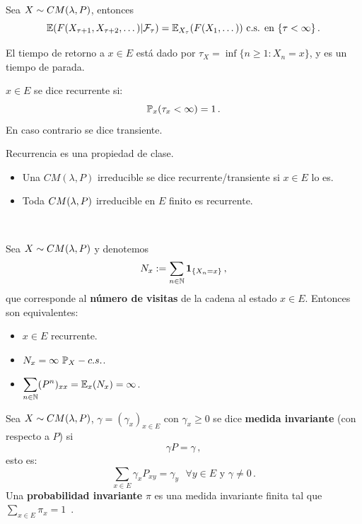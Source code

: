 \begin{theorem}
Sea $X\sim\cm$, entonces
$$ \E(F(X_{\tau+1},X_{\tau+2},\dots)|\mathcal{F}_\tau)=\E_{X_\tau}(F(X_1,\dots)) \mbox{ c.s. en }\{\tau<\infty\} \, .$$
\end{theorem}
\begin{remark}
El tiempo de retorno a $x\in E$ está dado por $\tau_X=\inf\{n\geq1:X_n=x\}$, y es un tiempo de parada.
\end{remark}
\begin{definition}
$x\in E$ se dice recurrente si:
$$ \P_x(\tau_x<\infty)=1 \, .$$
En caso contrario se dice transiente.
\end{definition}
\begin{remark}
Recurrencia es una propiedad de clase.
\end{remark}
\begin{proposition}
\beforeitemize
\begin{itemize}
    \item Una $CM(\lambda,P)$ irreducible se dice recurrente/transiente si $x\in E$ lo es.
    \item Toda $\cm$ irreducible en $E$ finito es recurrente.
\end{itemize}
\end{proposition}
\\ \vspace{3cm}
\begin{theorem}
\label{theorem:visitas}
Sea $X\sim\cm$ y denotemos
$$ N_x:=\displaystyle\sum_{n\in\N}\mathbf{1}_{\{X_n=x\}} \, ,$$
que corresponde al \textbf{número de visitas} de la cadena al estado $x\in E$.
\newline Entonces son equivalentes:
\begin{itemize}
    \item $x\in E$ recurrente.
    \item $N_x=\infty \mbox{ }\P_X-{ c.s.}$.
    \item $\displaystyle\sum_{n\in \N}(P^n)_{xx}=\E_x(N_x)=\infty$.
\end{itemize}
\end{theorem}
\begin{definition}
Sea $X\sim\cm$, $\gamma=(\gamma_x)_{x\in E}$ con $\gamma_x\geq0$ se dice \textbf{medida invariante} (con respecto a $P$) si
$$ \gamma P = \gamma \, ,$$
esto es:
$$ \sum_{x\in E}\gamma_xP_{xy}=\gamma_{y}\mbox{ }\forall y\in E \mbox{ y }\gamma\neq 0 \, .$$
Una \textbf{probabilidad invariante} $\pi$ es una medida invariante finita tal que $\sum_{x\in E}\pi_x = 1$ \,.
\end{definition}
